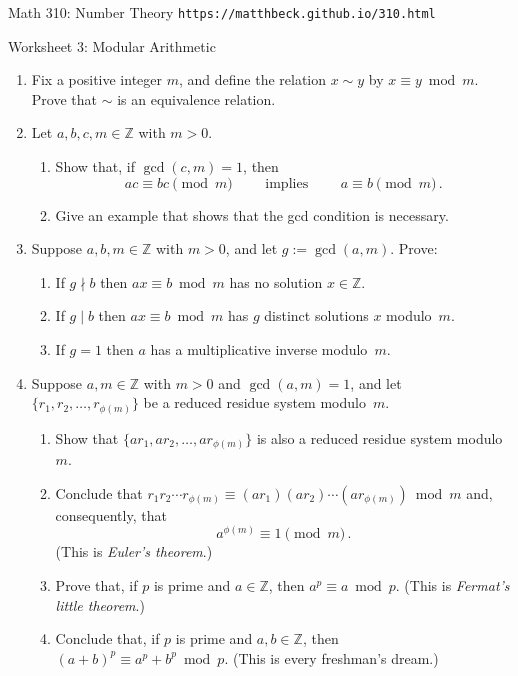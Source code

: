 \documentclass[11pt]{article}
\def\Z{\mathbb{Z}}
\begin{document}
\setlength{\parindent}{0pt}
\setlength{\parskip}{0.2cm}

{ Math 310: Number Theory} \hfill {\tt https://matthbeck.github.io/310.html}

\vspace{.3in}

\begin{center}
\Large{Worksheet 3: Modular Arithmetic}
\end{center}

\begin{enumerate}

\item Fix a positive integer $m$, and define the relation $x \sim y$ by $x \equiv y \bmod m$.
Prove that $\sim$ is an equivalence relation.

\item Let $a,b,c,m \in \Z$ with $m > 0$.
  \begin{enumerate}
  \item Show that, if $\gcd(c,m) = 1$, then
  \[
    ac \equiv bc \pmod m
    \qquad \text{ implies } \qquad
    a \equiv b  \pmod m \, .
  \]
  \item Give an example that shows that the gcd condition is necessary.
  \end{enumerate}

\item Suppose $a,b,m \in \Z$ with $m > 0$, and let $g := \gcd(a,m)$. Prove:
  \begin{enumerate}
  \item If $g \nmid b$ then $ax \equiv b \bmod m$ has no solution $x \in \Z$.
  \item If $g \mid b$ then $ax \equiv b \bmod m$ has $g$ distinct solutions $x$ modulo~$m$.
  \item If $g = 1$ then $a$ has a multiplicative inverse modulo~$m$.
  \end{enumerate}

\item Suppose $a,m \in \Z$ with $m > 0$ and $\gcd(a,m) = 1$, and let $\{ r_1, r_2, \dots, r_{ \phi(m) } \}$ be a
reduced residue system modulo~$m$.
  \begin{enumerate}
  \item Show that $\{ a r_1, a r_2, \dots, a r_{ \phi(m) } \}$ is also a reduced residue system modulo~$m$.
  \item Conclude that $r_1 r_2 \cdots r_{ \phi(m) } \equiv (a r_1) (a r_2) \cdots (a r_{ \phi(m) }) \bmod m$ and,
consequently, that
  \[
    a^{ \phi(m) } \equiv 1 \pmod m \, .
  \]
  (This is \emph{Euler's theorem}.)
  \item Prove that, if $p$ is prime and $a \in \Z$, then $a^p \equiv a \bmod p$.
  (This is \emph{Fermat's little theorem}.)
  \item Conclude that, if $p$ is prime and $a,b \in \Z$, then $(a+b)^p \equiv a^p + b^p \bmod p$.
  (This is every freshman's dream.)
  \end{enumerate}


\end{enumerate}
\end{document}
